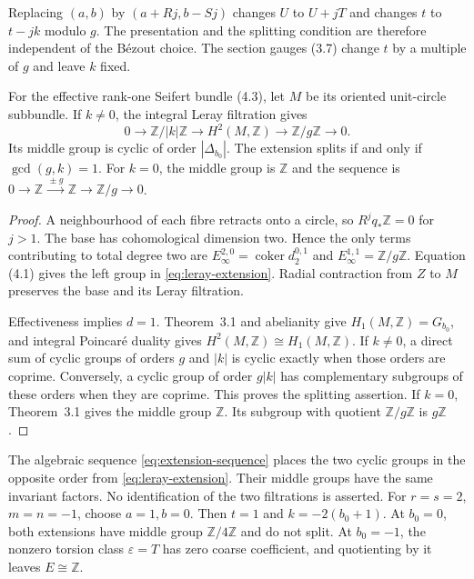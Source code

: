 \documentclass[11pt]{article}
\numberwithin{equation}{section}
\begin{document}
Replacing $(a,b)$ by $(a+Rj,b-Sj)$ changes $U$ to $U+jT$ and changes
$t$ to $t-jk$ modulo $g$.  The presentation and the splitting condition
are therefore independent of the B\'ezout choice.
The section gauges (3.7) change $t$ by a multiple of $g$ and leave $k$ fixed.

\begin{proposition}\label{prop:leray-extension}
For the effective rank-one Seifert bundle (4.3), let $M$ be its oriented
unit-circle subbundle.  If $k\ne0$, the integral Leray filtration gives
\begin{equation}\label{eq:leray-extension}
 0\longrightarrow\mathbb Z/|k|\mathbb Z
 \longrightarrow H^2(M,\mathbb Z)
 \longrightarrow\mathbb Z/g\mathbb Z\longrightarrow0.
\end{equation}
Its middle group is cyclic of order $|\Delta_{b_0}|$.
The extension splits if and only if $\gcd(g,k)=1$.
For $k=0$, the middle group is $\mathbb Z$ and the sequence is
$0\to\mathbb Z\xrightarrow{\,\pm g\,}\mathbb Z\to\mathbb Z/g\to0$.
\end{proposition}

\begin{proof}
A neighbourhood of each fibre retracts onto a circle, so
$R^jq_*\mathbb Z=0$ for $j>1$.  The base has cohomological dimension
two.  Hence the only terms contributing to total degree two are
$E_\infty^{2,0}=\operatorname{coker}d_2^{0,1}$ and
$E_\infty^{1,1}=\mathbb Z/g\mathbb Z$.  Equation (4.1) gives the
left group in \eqref{eq:leray-extension}.  Radial contraction from $Z$
to $M$ preserves the base and its Leray filtration.

Effectiveness implies $d=1$.  Theorem~3.1 and abelianity give
$H_1(M,\mathbb Z)=G_{b_0}$, and integral Poincar\'e duality gives
$H^2(M,\mathbb Z)\cong H_1(M,\mathbb Z)$.
If $k\ne0$, a direct sum of cyclic groups of orders $g$ and $|k|$ is
cyclic exactly when those orders are coprime.  Conversely, a cyclic group
of order $g|k|$ has complementary subgroups of these orders when they
are coprime.  This proves the splitting assertion.
If $k=0$, Theorem~3.1 gives the middle group $\mathbb Z$.
Its subgroup with quotient $\mathbb Z/g\mathbb Z$ is $g\mathbb Z$.
\end{proof}

The algebraic sequence \eqref{eq:extension-sequence} places the two
cyclic groups in the opposite order from \eqref{eq:leray-extension}.
Their middle groups have the same invariant factors.  No identification
of the two filtrations is asserted.
For $r=s=2$, $m=n=-1$, choose $a=1,b=0$.  Then $t=1$ and
$k=-2(b_0+1)$.  At $b_0=0$, both extensions have middle group
$\mathbb Z/4\mathbb Z$ and do not split.
At $b_0=-1$, the nonzero torsion class $\varepsilon=T$ has zero
coarse coefficient, and quotienting by it leaves $E\cong\mathbb Z$.
\end{document}
